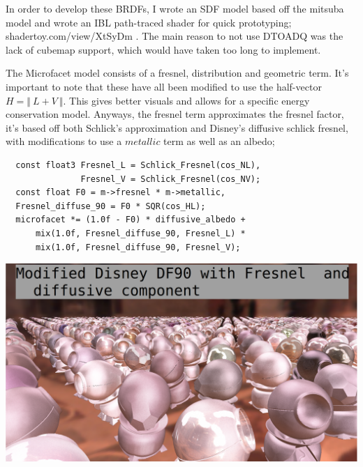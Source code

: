 \documentclass{article}
\begin{document}
  In order to develop these BRDFs, I wrote an SDF model based off the mitsuba
model and wrote an IBL path-traced shader for quick prototyping;
shadertoy.com/view/XtSyDm . The main reason to not use DTOADQ was the lack of
cubemap support, which would have taken too long to implement.
  
  The Microfacet model consists of a fresnel, distribution and geometric term.
It's important to note that these have all been modified to use the half-vector
$H = \Vert\:L+V\:\Vert$. This gives better visuals and allows for a specific
energy conservation model. Anyways, the fresnel term approximates the fresnel
factor, it's based off both Schlick's approximation and Disney's diffusive
schlick fresnel, with modifications to use a $metallic$ term as well as an
albedo;
  \begin{lstlisting}
  const float3 Fresnel_L = Schlick_Fresnel(cos_NL),
               Fresnel_V = Schlick_Fresnel(cos_NV);
  const float F0 = m->fresnel * m->metallic,
  Fresnel_diffuse_90 = F0 * SQR(cos_HL);
  microfacet *= (1.0f - F0) * diffusive_albedo +
      mix(1.0f, Fresnel_diffuse_90, Fresnel_L) *
      mix(1.0f, Fresnel_diffuse_90, Fresnel_V);
  \end{lstlisting}
  \includegraphics[scale=0.20]{fresnel}
  
\end{document}
